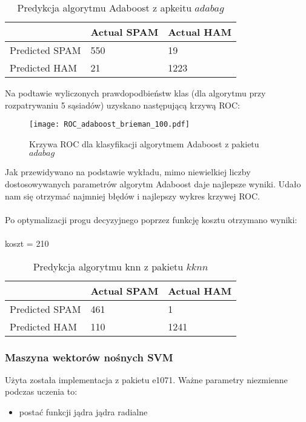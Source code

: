 \documentclass[fleqn]{article}
\begin{document}
\begin{table}[h!]
  \centering
  \label{tab:table1}
  \begin{tabular}{l||l|l}
     & Actual SPAM & Actual HAM\\
    \hline
    Predicted SPAM & 550 & 19\\
    Predicted HAM & 21 & 1223\\
  \end{tabular}
  \caption{Predykcja algorytmu Adaboost z apkeitu $adabag$}
\end{table}

\noindent Na podtawie wyliczonych prawdopodbieństw klas (dla algorytmu przy rozpatrywaniu 5 sąsiadów) uzyskano następującą krzywą ROC:

\begin{figure}[H]
\centering
\texttt{[image: ROC\_adaboost\_brieman\_100.pdf]}
\caption{Krzywa ROC dla klasyfikacji algorytmem Adaboost z pakietu $adabag$ \label{overflow}}
\label{fig:picture}
\end{figure}

\noindent Jak przewidywano na podstawie wykładu, mimo niewielkiej liczby dostosowywanych parametrów algorytm Adaboost daje najlepsze wyniki. Udało nam się otrzymać najmniej błędów i najlepszy wykres krzywej ROC.
\\ \\
\noindent Po optymalizacji progu decyzyjnego poprzez funkcję kosztu otrzymano wyniki:
\\ \\
koszt = 210

\begin{table}[h!]
  \centering
  \label{tab:table1}
  \begin{tabular}{l||l|l}
     & Actual SPAM & Actual HAM\\
    \hline
    Predicted SPAM & 461 & 1\\
    Predicted HAM & 110 & 1241\\
  \end{tabular}
  \caption{Predykcja algorytmu knn z pakietu $kknn$}
\end{table}


\subsubsection{Maszyna wektorów nośnych SVM}
Użyta została implementacja z pakietu e1071.
Ważne parametry niezmienne podczas uczenia to:
\begin{itemize}
    \item postać funkcji jądra jądra radialne
\end{itemize}
\end{document}
